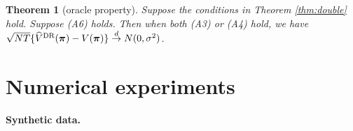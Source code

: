 \documentclass{article}
\newtheorem{thm}{Theorem}
\begin{document}
\begin{thm}[oracle property]\label{thm:oracleest}
	Suppose the conditions in Theorem \ref{thm:double} hold. Suppose (A6) holds. Then when both  (A3) or (A4) hold, we have  $\sqrt{NT} \{\widehat{V}^{\hbox{\scriptsize{DR}}}(\bm{\pi})-V(\bm{\pi})\}\stackrel{d}{\to} N(0,\sigma^2)$.
\end{thm}\vspace{-0.3cm}

\section{Numerical experiments}
\textbf{Synthetic data. }




	
\end{document}
